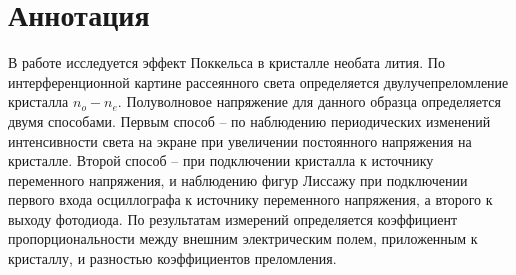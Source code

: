 \section*{Аннотация}

В работе исследуется эффект Поккельса в кристалле необата лития. По интерференционной картине рассеянного света определяется двулучепреломление кристалла $n_o - n_e$. Полуволновое напряжение для данного образца определяется двумя способами. Первым способ -- по наблюдению периодических изменений интенсивности света на экране при увеличении постоянного напряжения на кристалле. Второй способ -- при подключении кристалла к источнику переменного напряжения, и наблюдению фигур Лиссажу при подключении первого входа осциллографа к источнику переменного напряжения, а второго к выходу фотодиода. По результатам измерений определяется коэффициент пропорциональности между внешним электрическим полем, приложенным к кристаллу, и разностью коэффициентов преломления.